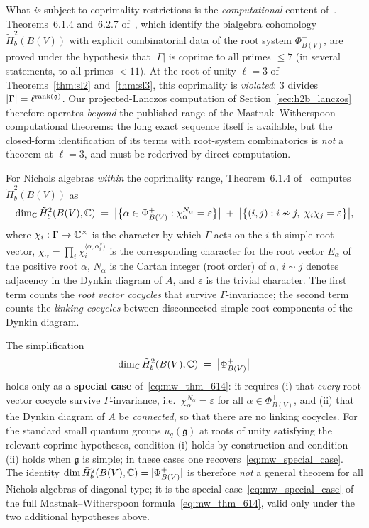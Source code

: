 What \emph{is} subject to coprimality restrictions is the \emph{computational} content of~\cite{MW08}. Theorems~6.1.4 and~6.2.7 of~\cite{MW08}, which identify the bialgebra cohomology $\tilde{H}^2_b(B(V))$ with explicit combinatorial data of the root system $\Phi^+_{B(V)}$, are proved under the hypothesis that $|\Gamma|$ is coprime to all primes $\leq 7$ (in several statements, to all primes $< 11$). At the root of unity $\ell = 3$ of Theorems~\ref{thm:sl2} and~\ref{thm:sl3}, this coprimality is \emph{violated}: $3$ divides $|\Gamma| = \ell^{\operatorname{rank}(\mathfrak{g})}$. Our projected-Lanczos computation of Section~\ref{sec:h2b_lanczos} therefore operates \emph{beyond} the published range of the Mastnak--Witherspoon computational theorems: the long exact sequence itself is available, but the closed-form identification of its terms with root-system combinatorics is \emph{not} a theorem at $\ell = 3$, and must be rederived by direct computation.

For Nichols algebras \emph{within} the coprimality range, Theorem~6.1.4 of~\cite{MW08} computes $\tilde{H}^2_b(B(V))$ as
\begin{equation}
\label{eq:mw_thm_614}
\dim_{\mathbb{C}} \tilde{H}^2_b(B(V), \mathbb{C}) \;=\; \bigl|\bigl\{\alpha \in \Phi^+_{B(V)} : \chi_\alpha^{N_\alpha} = \varepsilon\bigr\}\bigr| \;+\; \bigl|\bigl\{(i,j) : i \nsim j,\; \chi_i\chi_j = \varepsilon\bigr\}\bigr|,
\end{equation}
where $\chi_i : \Gamma \to \mathbb{C}^\times$ is the character by which $\Gamma$ acts on the $i$-th simple root vector, $\chi_\alpha = \prod_i \chi_i^{\langle \alpha, \alpha_i^\vee \rangle}$ is the corresponding character for the root vector $E_\alpha$ of the positive root $\alpha$, $N_\alpha$ is the Cartan integer (root order) of $\alpha$, $i \sim j$ denotes adjacency in the Dynkin diagram of $A$, and $\varepsilon$ is the trivial character. The first term counts the \emph{root vector cocycles} that survive $\Gamma$-invariance; the second term counts the \emph{linking cocycles} between disconnected simple-root components of the Dynkin diagram.

The simplification
\begin{equation}
\label{eq:mw_special_case}
\dim_{\mathbb{C}} \tilde{H}^2_b(B(V), \mathbb{C}) \;=\; \bigl|\Phi^+_{B(V)}\bigr|
\end{equation}
holds only as a \textbf{special case} of~\eqref{eq:mw_thm_614}: it requires (i) that \emph{every} root vector cocycle survive $\Gamma$-invariance, i.e.\ $\chi_\alpha^{N_\alpha} = \varepsilon$ for all $\alpha \in \Phi^+_{B(V)}$, and (ii) that the Dynkin diagram of $A$ be \emph{connected}, so that there are no linking cocycles. For the standard small quantum groups $u_q(\mathfrak{g})$ at roots of unity satisfying the relevant coprime hypotheses, condition (i) holds by construction and condition (ii) holds when $\mathfrak{g}$ is simple; in these cases one recovers~\eqref{eq:mw_special_case}. The identity $\dim \tilde{H}^2_b(B(V), \mathbb{C}) = |\Phi^+_{B(V)}|$ is therefore \emph{not} a general theorem for all Nichols algebras of diagonal type; it is the special case~\eqref{eq:mw_special_case} of the full Mastnak--Witherspoon formula~\eqref{eq:mw_thm_614}, valid only under the two additional hypotheses above.

